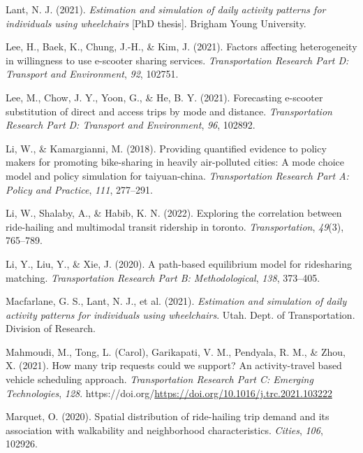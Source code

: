 \documentclass[fancy, masters]{byuthesis}
\newlength{\cslhangindent}
\newlength{\cslentryspacingunit} %
\newenvironment{CSLReferences}[2] %
 {%
  \setlength{\parindent}{0pt}
  \ifodd #1
  \let\oldpar\par
  \def\par{\hangindent=\cslhangindent\oldpar}
  \fi
  \setlength{\parskip}{#2\cslentryspacingunit}
 }%
 {}
\begin{document}
\begin{CSLReferences}{1}{0}
\leavevmode{}%
Lant, N. J. (2021). \emph{Estimation and simulation of daily activity patterns for individuals using wheelchairs} {[}PhD thesis{]}. Brigham Young University.

\leavevmode{}%
Lee, H., Baek, K., Chung, J.-H., \& Kim, J. (2021). Factors affecting heterogeneity in willingness to use e-scooter sharing services. \emph{Transportation Research Part D: Transport and Environment}, \emph{92}, 102751.

\leavevmode{}%
Lee, M., Chow, J. Y., Yoon, G., \& He, B. Y. (2021). Forecasting e-scooter substitution of direct and access trips by mode and distance. \emph{Transportation Research Part D: Transport and Environment}, \emph{96}, 102892.

\leavevmode{}%
Li, W., \& Kamargianni, M. (2018). Providing quantified evidence to policy makers for promoting bike-sharing in heavily air-polluted cities: A mode choice model and policy simulation for taiyuan-china. \emph{Transportation Research Part A: Policy and Practice}, \emph{111}, 277--291.

\leavevmode{}%
Li, W., Shalaby, A., \& Habib, K. N. (2022). Exploring the correlation between ride-hailing and multimodal transit ridership in toronto. \emph{Transportation}, \emph{49}(3), 765--789.

\leavevmode{}%
Li, Y., Liu, Y., \& Xie, J. (2020). A path-based equilibrium model for ridesharing matching. \emph{Transportation Research Part B: Methodological}, \emph{138}, 373--405.

\leavevmode{}%
Macfarlane, G. S., Lant, N. J., et al. (2021). \emph{Estimation and simulation of daily activity patterns for individuals using wheelchairs}. Utah. Dept. of Transportation. Division of Research.

\leavevmode{}%
Mahmoudi, M., Tong, L. (Carol), Garikapati, V. M., Pendyala, R. M., \& Zhou, X. (2021). How many trip requests could we support? An activity-travel based vehicle scheduling approach. \emph{Transportation Research Part C: Emerging Technologies}, \emph{128}. https://doi.org/\url{https://doi.org/10.1016/j.trc.2021.103222}

\leavevmode{}%
Marquet, O. (2020). Spatial distribution of ride-hailing trip demand and its association with walkability and neighborhood characteristics. \emph{Cities}, \emph{106}, 102926.


\end{CSLReferences}
\end{document}
